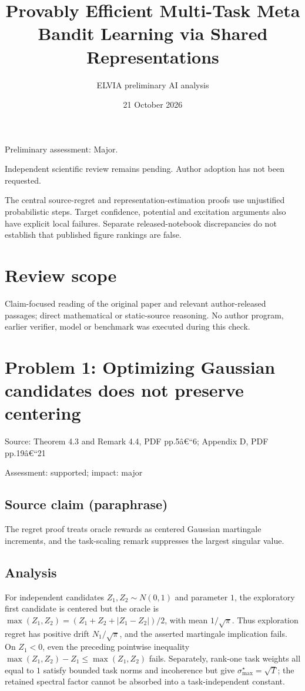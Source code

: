 \documentclass[11pt]{article}
\begin{document}
\title{Provably Efficient Multi-Task Meta Bandit Learning via Shared Representations}

\author{ELVIA preliminary AI analysis}\date{21 October 2026}\maketitle

Preliminary assessment: Major.\par

Independent scientific review remains pending. Author adoption has not been requested.

The central source-regret and representation-estimation proofs use unjustified probabilistic steps. Target confidence, potential and excitation arguments also have explicit local failures. Separate released-notebook discrepancies do not establish that published figure rankings are false.

\section*{Review scope}

Claim-focused reading of the original paper and relevant author-released passages; direct mathematical or static-source reasoning. No author program, earlier verifier, model or benchmark was executed during this check.

\section*{Problem 1: Optimizing Gaussian candidates does not preserve centering}

Source: Theorem 4.3 and Remark 4.4, PDF pp.5â€“6; Appendix D, PDF pp.19â€“21

Assessment: supported; impact: major

\subsection*{Source claim (paraphrase)}

The regret proof treats oracle rewards as centered Gaussian martingale increments, and the task-scaling remark suppresses the largest singular value.

\subsection*{Analysis}

For independent candidates \(Z_1,Z_2\sim N(0,1)\) and parameter \(1\), the exploratory first candidate is centered but the oracle is \(\max(Z_1,Z_2)=(Z_1+Z_2+|Z_1-Z_2|)/2\), with mean \(1/\sqrt{\pi}\). Thus exploration regret has positive drift \(N_1/\sqrt{\pi}\), and the asserted martingale implication fails. On \(Z_1<0\), even the preceding pointwise inequality \(\max(Z_1,Z_2)-Z_1\le\max(Z_1,Z_2)\) fails. Separately, rank-one task weights all equal to \(1\) satisfy bounded task norms and incoherence but give \(\sigma_{\max}^{\star}=\sqrt T\); the retained spectral factor cannot be absorbed into a task-independent constant.
\end{document}
